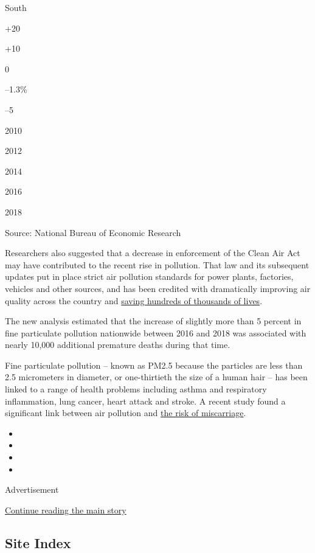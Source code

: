 South

+20

+10

0

--1.3\%

­--5

2010

2012

2014

2016

2018

Source: National Bureau of Economic Research

Researchers also suggested that a decrease in enforcement of the Clean
Air Act may have contributed to the recent rise in pollution. That law
and its subsequent updates put in place strict air pollution standards
for power plants, factories, vehicles and other sources, and has been
credited with dramatically improving air quality across the country and
\href{https://www.epa.gov/clean-air-act-overview/benefits-and-costs-clean-air-act-1990-2020-second-prospective-study}{saving
hundreds of thousands of lives}.

The new analysis estimated that the increase of slightly more than 5
percent in fine particulate pollution nationwide between 2016 and 2018
was associated with nearly 10,000 additional premature deaths during
that time.

Fine particulate pollution -- known as PM2.5 because the particles are
less than 2.5 micrometers in diameter, or one-thirtieth the size of a
human hair -- has been linked to a range of health problems including
asthma and respiratory inflammation, lung cancer, heart attack and
stroke. A recent study found a significant link between air pollution
and
\href{http://nytimes3xbfgragh.onion/2019/10/14/world/asia/china-air-pollution-miscarriages-study.html}{the
risk of miscarriage}.

\begin{itemize}
\item
\item
\item
\item
\end{itemize}

Advertisement

\protect\hyperlink{after-bottom}{Continue reading the main story}

\hypertarget{site-index}{%
\subsection{Site Index}\label{site-index}}

